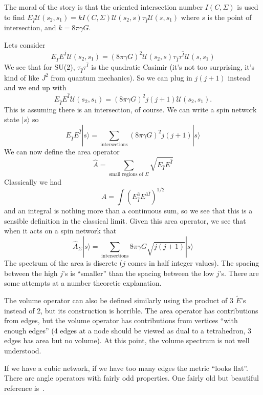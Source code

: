 The moral of the story is that the oriented intersection number
$I(C,\Sigma)$ is used to find $E_{\hat{I}}\mathcal{U}(s_2,s_1) =
k I(C,\Sigma)\mathcal{U}(s_2,s)\tau_{\hat{I}}\mathcal{U}(s,s_1)$
where $s$ is the point of intersection, and $k=8\pi\gamma G$.

Lets consider 
\begin{equation}
E_{\hat{I}}E^{\hat{I}}\mathcal{U}(s_2,s_1)=(8\pi\gamma G)^{2} \mathcal{U}(s_2,s)\tau_{\hat{I}}\tau^{\hat{I}}\mathcal{U}(s,s_1)
\end{equation}
We see that for SU(2), $\tau_{\hat{I}}\tau^{\hat{I}}$ is the
quadratic Casimir (it's not too surprising, it's kind of like
$J^2$ from quantum mechanics). So we can plug in $j(j+1)$ instead
and we end up with
\begin{equation}
E_{\hat{I}}E^{\hat{I}}\mathcal{U}(s_2,s_1)=(8\pi\gamma G)^{2}j(j+1) \mathcal{U}(s_2,s_1).
\end{equation}
This is assuming there is an intersection, of course. We can
write a spin network state $|s\rangle$ so
\begin{equation}
E_{\hat{I}}E^{\hat{I}}|s\rangle = \sum_{\text{intersections}}(8\pi\gamma G)^{2}j(j+1)|s\rangle
\end{equation}
We can now define the area operator
\begin{equation}
\widehat{A} = \sum_{\text{small regions of
  }\Sigma}\sqrt{E_{\hat{I}}E^{\hat{I}}}
\end{equation}
Classically we had
\begin{equation}
A = \int (E^{3}_{\widehat{I}}E^{3\widehat{I}})^{1/2}
\end{equation}
and an integral is nothing more than a continuous sum, so we see
that this is a sensible definition in the classical limit. Given
this area operator, we see that when it acts on a spin network
that
\begin{equation}
\widehat{A}_{\Sigma}|s\rangle =
\sum_{\text{intersections}}8\pi\gamma G\sqrt{j(j+1)}|s\rangle
\end{equation}
The spectrum of the area is discrete ($j$ comes in half integer
values). The spacing between the high $j$'s is ``smaller'' than
the spacing between the low $j$'s. There are some attempts at a
number theoretic explanation.

The volume operator can also be defined similarly using the
product of 3 $\widetilde{E}$'s instead of 2, but its construction
is horrible. The area operator has contributions from edges, but
the volume operator has contributions from vertices ``with enough
edges'' (4 edges at a node should be viewed as dual to a
tetrahedron, 3 edges has area but no volume). At this point, the
volume spectrum is not well understood.

If we have a cubic network, if we have too many edges the metric
``looks flat''. There are angle operators with fairly odd
properties. One fairly old but beautiful reference is~\cite{Rovelli:1998gg}.
